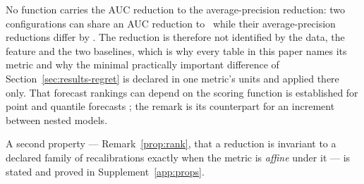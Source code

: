\begin{remark}
\label{prop:nonid}
No function carries the AUC reduction to the average-precision reduction: two
configurations can share an AUC reduction to \propOneAucGap\ while their
average-precision reductions differ by \propOneApGap. The reduction is
therefore not identified by the data, the feature and the two baselines, which
is why every table in this paper names its metric and why the minimal
practically important difference of Section~\ref{sec:results-regret} is
declared in one metric's units and applied there only. That forecast rankings
can depend on the scoring function is established for point and quantile
forecasts \citep{ehm2016quantiles,patton2020comparing}; the remark is its
counterpart for an increment between nested models.
\end{remark}

\noindent A second property --- Remark~\ref{prop:rank}, that a reduction is
invariant to a declared family of recalibrations exactly when the metric is
\emph{affine} under it --- is stated and proved in
Supplement~\ref{app:props}.
